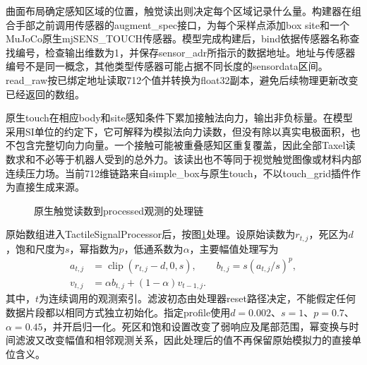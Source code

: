 曲面布局确定感知区域的位置，触觉读出则决定每个区域记录什么量。构建器在组合手部之前调用传感器的augment\_spec接口，为每个采样点添加box site和一个MuJoCo原生mjSENS\_TOUCH传感器。模型完成构建后，bind依据传感器名称查找编号，检查输出维数为1，并保存sensor\_adr所指示的数据地址。地址与传感器编号不是同一概念，其他类型传感器可能占据不同长度的sensordata区间。read\_raw按已绑定地址读取712个值并转换为float32副本，避免后续物理更新改变已经返回的数组。

原生touch在相应body和site感知条件下累加接触法向力，输出非负标量\cite{mujoco2026xml}。在模型采用SI单位的约定下，它可解释为模拟法向力读数，但没有除以真实电极面积，也不包含完整切向力向量。一个接触可能被重叠感知区重复覆盖，因此全部Taxel读数求和不必等于机器人受到的总外力。该读出也不等同于视觉触觉图像或材料内部连续压力场\cite{si2022taxim,sferrazza2022simtoreal}。当前712维链路来自simple\_box与原生touch，不以touch\_grid插件作为直接生成来源。

\begin{figure}[htbp]
  \centering
  \caption{原生触觉读数到processed观测的处理链}
  \label{fig:ch02_processing}
\end{figure}

原始数组进入TactileSignalProcessor后，按图\ref{fig:ch02_processing}处理。设原始读数为$r_{t,j}$，死区为$d$，饱和尺度为$s$，幂指数为$p$，低通系数为$\alpha$，主要幅值处理写为
\begin{equation}
 \begin{aligned}
 a_{t,j}&=\operatorname{clip}(r_{t,j}-d,0,s),\qquad
 b_{t,j}=s(a_{t,j}/s)^p,\\
 v_{t,j}&=\alpha b_{t,j}+(1-\alpha)v_{t-1,j}.
 \end{aligned}
 \label{eq:ch02_processing}
\end{equation}
其中，$t$为连续调用的观测索引。滤波初态由处理器reset路径决定，不能假定任何数据片段都以相同方式独立初始化。指定profile使用$d=0.002$、$s=1$、$p=0.7$、$\alpha=0.45$，并开启归一化。死区和饱和设置改变了弱响应及尾部范围，幂变换与时间滤波又改变幅值和相邻观测关系，因此处理后的值不再保留原始模拟力的直接单位含义。

